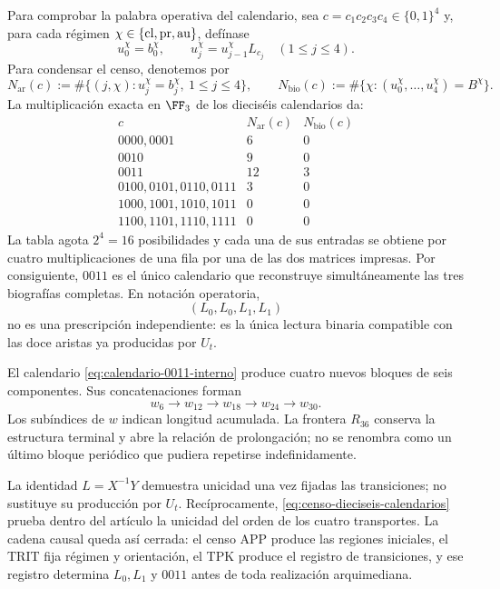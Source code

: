 Para comprobar la palabra operativa del calendario, sea
\(c=c_1c_2c_3c_4\in\{0,1\}^4\) y, para cada régimen
\(\chi\in\{{\rm cl},{\rm pr},{\rm au}\}\), defínase
\[
 u_0^\chi=b_0^\chi,\qquad
 u_j^\chi=u_{j-1}^\chi L_{c_j}\quad(1\le j\le4).
\]
Para condensar el censo, denotemos por
\[
 N_{\mathrm{ar}}(c):=
 \#\{(j,\chi):u_j^\chi=b_j^\chi,\ 1\le j\le4\},\qquad
 N_{\mathrm{bio}}(c):=
 \#\{\chi:(u_0^\chi,\ldots,u_4^\chi)=B^\chi\}.
\]
La multiplicación exacta en \(\FF_3\) de los dieciséis calendarios da:
\[
\begin{array}{c|c|c}
 c&N_{\mathrm{ar}}(c)&N_{\mathrm{bio}}(c)\\ \hline
0000,0001&6&0\\
0010&9&0\\
0011&12&3\\
0100,0101,0110,0111&3&0\\
1000,1001,1010,1011&0&0\\
1100,1101,1110,1111&0&0
\end{array}
\tag{D}
\label{eq:censo-dieciseis-calendarios}
\]
La tabla agota \(2^4=16\) posibilidades y cada una de sus entradas se obtiene
por cuatro multiplicaciones de una fila por una de las dos matrices impresas.
Por consiguiente, \(0011\) es el único calendario que reconstruye
simultáneamente las tres biografías completas. En notación operatoria,
\begin{equation}
 (L_0,L_0,L_1,L_1)
 \label{eq:calendario-0011-interno}
\end{equation}
no es una prescripción independiente: es la única lectura binaria compatible
con las doce aristas ya producidas por \(U_t\).

El calendario \eqref{eq:calendario-0011-interno} produce cuatro nuevos
bloques de seis componentes. Sus concatenaciones forman
\[
 w_6\longrightarrow w_{12}\longrightarrow w_{18}
 \longrightarrow w_{24}\longrightarrow w_{30}.
\]
Los subíndices de \(w\) indican longitud acumulada. La frontera \(R_{36}\) conserva la estructura terminal y abre la relación de prolongación; no se renombra como un último bloque periódico que pudiera repetirse indefinidamente.

La identidad \(L=X^{-1}Y\) demuestra unicidad una vez fijadas las
transiciones; no sustituye su producción por \(U_t\). Recíprocamente,
\eqref{eq:censo-dieciseis-calendarios} prueba dentro del artículo la unicidad
del orden de los cuatro transportes. La cadena causal queda así cerrada:
el censo APP produce las regiones iniciales, el TRIT fija régimen y
orientación, el TPK produce el registro de transiciones, y ese registro
determina \(L_0,L_1\) y \(0011\) antes de toda realización arquimediana.

